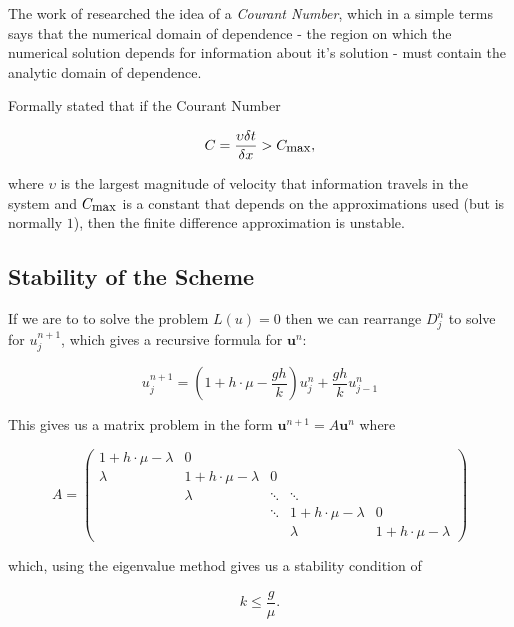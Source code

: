 \documentclass[../main.tex]{subfiles}
\begin{document}
  The work of \cite{courant1928} researched the idea of a \emph{Courant Number}, which in a simple terms says that the numerical domain of dependence - the region on which the numerical solution depends for information about it's solution - must contain the analytic domain of dependence.

  Formally \cite{courant1928} stated that if the Courant Number

  \begin{equation}
    C = \frac{\upsilon \delta t}{\delta x} > C_{\mbox{\small max}},
  \end{equation}

  where $\upsilon$ is the largest magnitude of velocity that information travels in the system and $C_{\mbox{\small max}}$ is a constant that depends on the approximations used (but is normally $1$), then the finite difference approximation is unstable.

  \subsection{Stability of the Scheme}
  If we are to to solve the problem $L(u) = 0$ then we can rearrange $D^n_j$ to solve for $u^{n+1}_j$, which gives a recursive formula for $\mathbf{u}^n$:

  \begin{equation} \label{method:eq:mvffde}
    u^{n+1}_j = \left(1 + h \cdot \mu - \frac{gh}{k} \right) u^n_j + \frac{gh}{k} u^n_{j-1}
  \end{equation}

  This gives us a matrix problem in the form $\mathbf{u}^{n+1} = A \mathbf{u}^n$ where

  \begin{equation}\label{method:eq:noboundary}
    A = \begin{pmatrix}
      1 + h \cdot \mu - \lambda & 0 & \\
      \lambda & 1 + h \cdot \mu - \lambda & 0 \\
        & \lambda & \ddots & \ddots & \\
        &   & \ddots & 1 + h \cdot \mu - \lambda & 0 \\
        &   &        & \lambda & 1 + h \cdot \mu - \lambda
    \end{pmatrix}
  \end{equation}

  which, using the eigenvalue method gives us a stability condition of

  \begin{equation}
    k \leq \frac{g}{\mu}.
  \end{equation}
\end{document}
